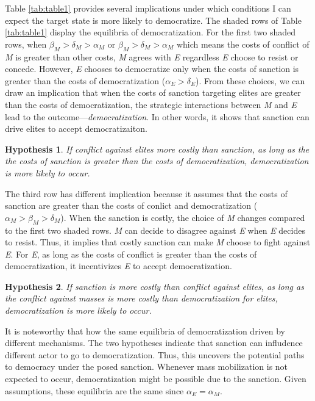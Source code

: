 \documentclass[11pt]{article}
\newtheorem{hyp}{Hypothesis}
\begin{document}
Table \ref{tab:table1} provides several implications under which conditions I can expect the target state is more likely to democratize. The shaded rows of Table \ref{tab:table1} display the equilibria of democratization. For the first two shaded rows, when $\beta_{M} > \delta_{M} > \alpha_{M}$ or $\beta_{M} > \delta_{M} > \alpha_{M}$ which means the costs of conflict of \textit{M} is greater than other costs, \textit{M} agrees with \textit{E} regardless \textit{E} choose to resist or concede. However, \textit{E} chooses to democratize only when the costs of sanction is greater than the costs of democratization ($\alpha_{E} > \delta_{E}$). From these choices, we can draw an implication that when the costs of sanction targeting elites are greater than the costs of democratization, the strategic interactions between \textit{M} and \textit{E} lead to the outcome---\textit{democratization}. In other words, it shows that sanction can drive elites to accept democratizaiton.

\begin{hyp}\label{h1} If conflict against elites more costly than sanction, as long as the the costs of sanction is greater than the costs of democratization, democratization is more likely to occur. \end{hyp}

The third row has different implication because it assumes that the costs of sanction are greater than the costs of conlict and democratization ($\alpha_{M} > \beta_{M} > \delta_{M}$). When the sanction is costly, the choice of \textit{M} changes compared to the first two shaded rows. \textit{M} can decide to disagree against \textit{E} when \textit{E} decides to resist. Thus, it implies that costly sanction can make \textit{M} choose to fight against \textit{E}. For \textit{E}, as long as the costs of conflict is greater than the costs of democratization, it incentivizes \textit{E} to accept democratization.

\begin{hyp}\label{h2} If sanction is more costly than conflict against elites, as long as the conflict against masses is more costly than democratization for elites, democratization is more likely to occur. \end{hyp}

It is noteworthy that how the same equilibria of democratization driven by different mechanisms. The two hypotheses indicate that sanction can infludence different actor to go to democratization. Thus, this uncovers the potential paths to democracy under the posed sanction. Whenever mass mobilization is not expected to occur, democratization might be possible due to the sanction. Given assumptions, these equilibria are the same since $\alpha_{E} = \alpha_{M}$.
\end{document}
